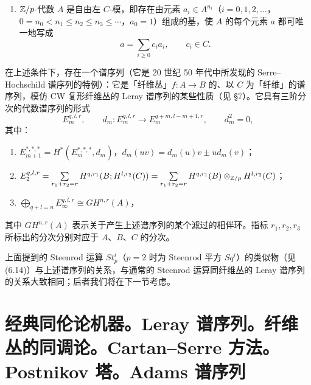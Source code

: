 \begin{enumerate}[label=(\roman*),leftmargin=2.2em,start=2]
\item $\mathbb{Z}/p$-代数 $A$ 是自由左 $C$-模，即存在由元素 $a_i\in A^{n_i}$（$i=0,1,2,\dots$，$0=n_0<n_1\le n_2\le n_3\le\cdots$，$a_0=1$）组成的基，使 $A$ 的每个元素 $a$ 都可唯一地写成
\[
a=\sum_{i\ge0}c_ia_i,\qquad c_i\in C.
\]
\end{enumerate}

在上述条件下，存在一个谱序列（它是 20 世纪 50 年代中所发现的 Serre--Hochschild 谱序列的特例）：它是「纤维丛」$f:A\to B$ 的、以 $C$ 为「纤维」的谱序列，模仿 CW 复形纤维丛的 Leray 谱序列的某些性质（见 §7）。它具有三阶分次的代数谱序列的形式
\[
E_m^{q,l,r},\qquad d_m:E_m^{q,l,r}\longrightarrow E_m^{q+m,l-m+1,r},\qquad d_m^2=0,
\]
其中：
\begin{enumerate}[label=\arabic*.,leftmargin=2em]
\item $E_{m+1}^{*,*,*}=H^*(E_m^{*,*,*},d_m)$，$d_m(uv)=d_m(u)v\pm ud_m(v)$；
\item $E_2^{q,l,r}=\sum\limits_{r_1+r_2=r}H^{q,r_1}(B;H^{l,r_2}(C))=\sum\limits_{r_1+r_2=r}H^{q,r_1}(B)\otimes_{\mathbb{Z}/p}H^{l,r_2}(C)$；
\item $\bigoplus\limits_{q+l=n}E_\infty^{q,l,r}\cong GH^{n,r}(A)$，
\end{enumerate}
其中 $GH^{n,r}(A)$ 表示关于产生上述谱序列的某个滤过的相伴环。指标 $r_1,r_2,r_3$ 所标出的分次分别对应于 $A$、$B$、$C$ 的分次。

上面提到的 Steenrod 运算 $St^i_p$（$p=2$ 时为 Steenrod 平方 $Sq^i$）的类似物（见 (6.14)）与上述谱序列的关系，与通常的 Steenrod 运算同纤维丛的 Leray 谱序列的关系大致相同；后者我们将在下一节考虑。

\section[经典同伦论机器。 Leray 谱序列。 Cartan--Serre 方法]{经典同伦论机器。Leray 谱序列。纤维丛的同调论。Cartan--Serre 方法。Postnikov 塔。Adams 谱序列}


